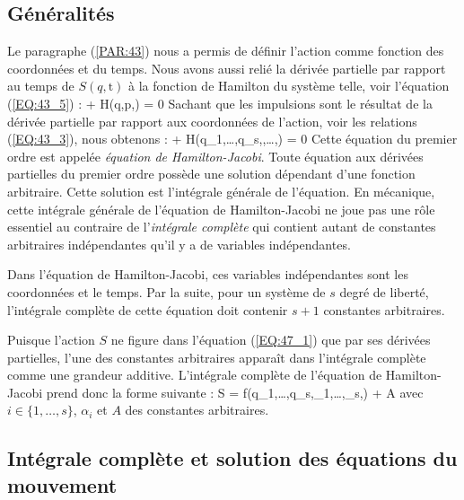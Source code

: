 \subsection{G\'{e}n\'{e}ralit\'{e}s}

Le paragraphe (\ref{PAR:43}) nous a permis de d\'{e}finir l'action comme fonction des coordonn\'{e}es et du temps. Nous avons aussi reli\'{e} la d\'{e}riv\'{e}e partielle par rapport au temps de $S(q,\mathrm{t})$ \`{a} la fonction de Hamilton du syst\`{e}me telle, voir l'\'{e}quation (\ref{EQ:43_5}) :
\benn
	 + H(q,p,) = 0
\eenn
Sachant que les impulsions sont le r\'{e}sultat de la d\'{e}riv\'{e}e partielle par rapport aux coordonn\'{e}es de l'action, voir les relations (\ref{EQ:43_3}), nous obtenons :
\be
	 + H(q_{1},\ldots,q_{s},,\ldots,) = 0 \label{EQ:47_1}
\ee
Cette \'{e}quation du premier ordre est appel\'{e}e \emph{\'{e}quation de Hamilton-Jacobi}. Toute \'{e}quation aux d\'{e}riv\'{e}es partielles du premier ordre poss\`{e}de une solution d\'{e}pendant d'une fonction arbitraire. Cette solution est l'int\'{e}grale g\'{e}n\'{e}rale de l'\'{e}quation. En m\'{e}canique, cette int\'{e}grale g\'{e}n\'{e}rale de l'\'{e}quation de Hamilton-Jacobi ne joue pas une r\^{o}le essentiel au contraire de l'\emph{int\'{e}grale compl\`{e}te} qui contient autant de constantes arbitraires ind\'{e}pendantes qu'il y a de variables ind\'{e}pendantes.

Dans l'\'{e}quation de Hamilton-Jacobi, ces variables ind\'{e}pendantes sont les coordonn\'{e}es et le temps. Par la suite, pour un syst\`{e}me de $s$ degr\'{e} de libert\'{e}, l'int\'{e}grale compl\`{e}te de cette \'{e}quation doit contenir $s+1$ constantes arbitraires.

Puisque l'action $S$ ne figure dans l'\'{e}quation (\ref{EQ:47_1}) que par ses d\'{e}riv\'{e}es partielles, l'une des constantes arbitraires appara\^{i}t dans l'int\'{e}grale compl\`{e}te comme une grandeur additive. L'int\'{e}grale compl\`{e}te de l'\'{e}quation de Hamilton-Jacobi prend donc la forme suivante :
\be
	S = f(q_{1},\ldots,q_{s},\alpha_{1},\ldots,\alpha_{s},) + A \label{EQ:47_2}
\ee
avec $i \in \{1,\ldots,s\}$, $\alpha_{i}$ et $A$ des constantes arbitraires.

\subsection{Int\'{e}grale compl\`{e}te et solution des \'{e}quations du mouvement}\label{PAR:47_1}

